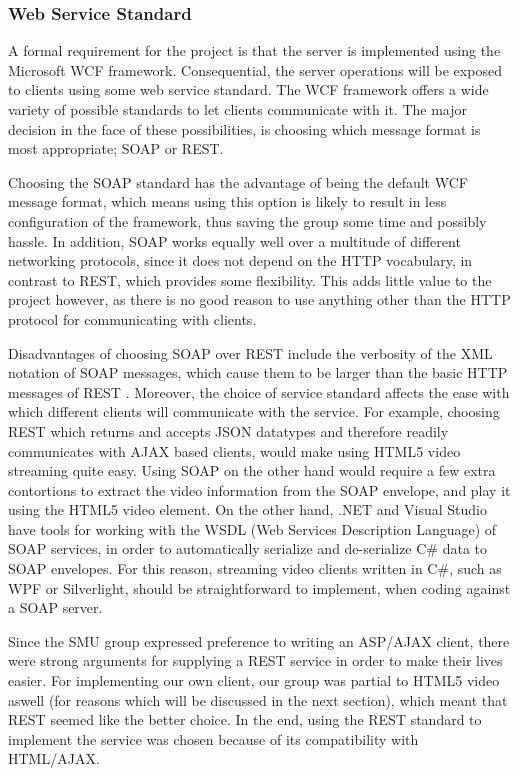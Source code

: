 \subsubsection{Web Service Standard}
A formal requirement for the project is that the server is implemented using the Microsoft WCF framework. Consequential, the server operations will be exposed to clients using some web service standard. The WCF framework offers a wide variety of possible standards to let clients communicate with it. The major decision in the face of these possibilities, is choosing which message format is most appropriate; SOAP or REST.

Choosing the SOAP standard has the advantage of being the default WCF message format, which means using this option is likely to result in less configuration of the framework, thus saving the group some time and possibly hassle. In addition, SOAP works equally well over a multitude of different networking protocols, since it does not depend on the HTTP vocabulary, in contrast to REST, which provides some flexibility. This adds little value to the project however, as there is no good reason to use anything other than the HTTP protocol for communicating with clients.

Disadvantages of choosing SOAP over REST include the verbosity of the XML notation of SOAP messages, which cause them to be larger than the basic HTTP messages of REST \cite{SOAP}. Moreover, the choice of service standard affects the ease with which different clients will communicate with the service. For example, choosing REST which returns and accepts JSON datatypes and therefore readily communicates with AJAX based clients, would make using  HTML5 video streaming quite easy. Using SOAP on the other hand would require a few extra contortions to extract the video information from the SOAP envelope, and play it using the HTML5 video element. On the other hand, .NET and Visual Studio have tools for working with the WSDL (Web Services Description Language) of SOAP services, in order to automatically serialize and de-serialize C\# data to SOAP envelopes. For this reason, streaming video clients written in C\#, such as WPF or Silverlight, should be straightforward to implement, when coding against a SOAP server.

Since the SMU group expressed preference to writing an ASP/AJAX client, there were strong arguments for supplying a REST service in order to make their lives easier. For implementing our own client, our group was partial to HTML5 video aswell (for reasons which will be discussed in the next section), which meant that REST seemed like the better choice. In the end, using the REST standard to implement the service was chosen because of its compatibility with HTML/AJAX.

